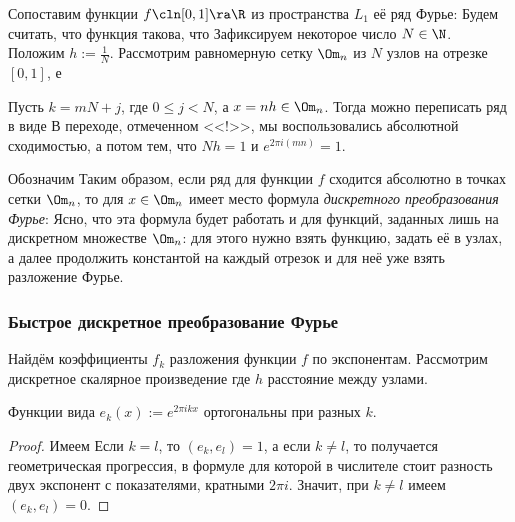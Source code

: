 \documentclass[a4paper]{article}
\begin{document}
Сопоставим функции $f\cln[0,1]\ra \R$ из пространства $L_1$ её ряд
Фурье:   Будем
считать, что функция такова, что 
Зафиксируем некоторое число $N \in \N$. Положим
$h:=\frac1N$. Рассмотрим равномерную сетку $\Om_n$ из $N$ узлов на
отрезке $[0,1]$, е 

Пусть $ k =mN + j$, где $0\le j < N$, а $x = nh \in \Om_n$. Тогда
можно переписать ряд в виде   В переходе, отмеченном <<!>>, мы
воспользовались абсолютной сходимостью, а потом тем, что $Nh=1$ и
$e^{2\pi i (mn)}=1$.

Обозначим   Таким образом, если
ряд для функции $f$ сходится абсолютно в точках сетки $\Om_n$, то для
$x\in \Om_n$ имеет место формула \emph{дискретного преобразования
  Фурье}:   Ясно, что
эта формула будет работать и для функций, заданных лишь на дискретном
множестве $\Om_n$: для этого нужно взять функцию, задать её в узлах, а
далее продолжить константой на каждый отрезок и для неё уже взять
разложение Фурье.

\subsubsection{Быстрое дискретное преобразование Фурье}

Найдём коэффициенты $f_k$ разложения функции $f$ по
экспонентам. Рассмотрим дискретное скалярное произведение  где $h$ расстояние между
узлами.

\begin{stm}
Функции вида $e_k(x) := e^{2\pi ik x}$ ортогональны при разных $k$.
\end{stm}
\begin{proof}
Имеем   Если $k=l$, то $(e_k,e_l) = 1$, а если
$k\neq l$, то получается геометрическая прогрессия, в формуле для
которой в числителе стоит разность двух экспонент с показателями,
кратными $2\pi i$. Значит, при $k\neq l$ имеем $(e_k,e_l) =0$.
\end{proof}
\end{document}
